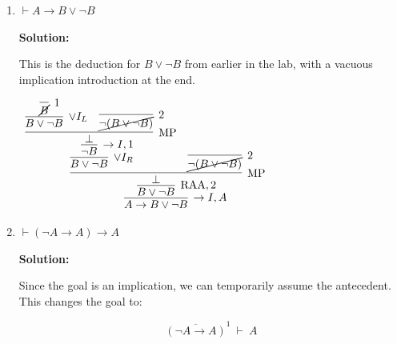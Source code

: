 \documentclass[11pt]{report}
\newcommand{\temp}[2]{{\overline{#2}}^{#1}}
\begin{document}
\begin{enumerate}
\begin{enumerate}
		In fact, this theorem can be made even stranger by noticing that the second $A$ can be any proposition, below denoted $C$ in the proof which makes explicit use of RAA: 
		\begin{small}
			\begin{center}
				$\begin{array}{c}
					\infer[\RAA,2]{(A \to B) \lor (B \to C)}
						{\infer[]{\bot}
							{\infer[\lor I_{R}]{(A \to B) \lor (B \to C)}
								{\infer[\to I,1]{B \to C}
									{\infer[\XF]{C}
										{\infer[\MP]{\bot}
											{\infer[2]{\cancel{\lnot[(A \to B) \lor (B \to C)]}}{}
											&
											\infer[\lor I_{L}]{(A \to B) \lor (B \to C)}
												{\infer[\to I]{A \to B}
													{\infer[1]{\cancel{B}}{}}}}}}}
							&
							\infer[2]{\cancel{\lnot[(A \to B) \lor (B \to C)]}}{}}}				
				\end{array}$
			\end{center}
		\end{small}		
		
		\item $\vdash A \to B \lor \neg B$  
		
		\textbf{Solution:}

		This is the deduction for $B \lor \lnot B$ from earlier in the lab, with a vacuous implication introduction at the end. 

		\begin{center}
			$\begin{array}{c}
				\infer[\to I, A]{A \to B \lor \lnot B}
					{\infer[\RAA,2]{B \lor \lnot B}
						{\infer[\MP]{\bot}
							{\infer[\lor I_{R}]{B \lor \lnot B}
								{\infer[\to I,1]{\lnot B}
									{\infer[\MP]{\bot}
										{\infer[\lor I_{L}]{B \lor \lnot B}{\infer[1]{\cancel{B}}{}}
										&
										\infer[2]{\cancel{\lnot (B \lor \lnot B)}}{}}}}
							&
							\infer[2]{\cancel{\lnot(B \lor \lnot B)}}{}}}}

			\end{array}$

		\end{center}
		
		\newpage
		\item $\vdash (\neg A \to A) \to A$  
		
		\textbf{Solution:}

		Since the goal is an implication, we can temporarily assume the antecedent. This changes the goal to: 

		$$\temp{1}{(\neg A \to A)} \ \vdash \ A$$


\end{enumerate}
\end{enumerate}
\end{document}
